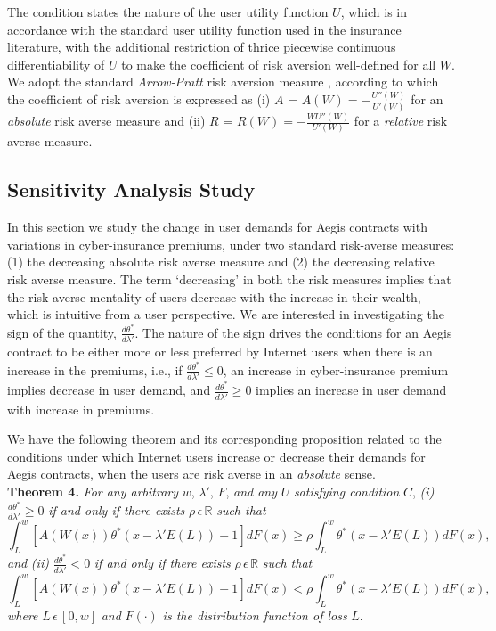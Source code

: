 \documentclass[letterpaper,12pt, onecolumn, nodraft]{IEEEtran}
\begin{document}
The condition states the nature of the user utility function $U$, which is in accordance with the standard user utility function used in the insurance literature, with the additional restriction of thrice piecewise continuous differentiability of $U$ to make the coefficient of risk aversion well-defined for all $W$. We adopt the standard \emph{Arrow-Pratt} risk aversion measure \cite{mwg}, according to which the coefficient of risk aversion is expressed as (i) $A$ = $A(W) = -\frac{U''(W)}{U'(W)}$ for an \emph{absolute} risk averse measure and (ii) $R$ = $R(W) = -\frac{WU''(W)}{U'(W)}$  for a \emph{relative} risk averse measure. 
\subsection{Sensitivity Analysis Study}
In this section we study the change in user demands for Aegis contracts with variations in cyber-insurance premiums, under two standard risk-averse measures: (1) the decreasing absolute risk averse measure and (2) the decreasing relative risk averse measure. The term `decreasing' in both the risk measures implies that the risk averse mentality of users decrease with the increase in their wealth, which is intuitive from a user perspective. We are interested in investigating the sign of the quantity, $\frac{d\theta^{*}}{d\lambda'}$. The nature of the sign drives the conditions for an Aegis contract to be either more or less preferred by Internet users when there is an increase in the premiums, i.e., if $\frac{d\theta^{*}}{d\lambda'} \le 0$, an increase in cyber-insurance premium implies decrease in user demand, and $\frac{d\theta^{*}}{d\lambda'}  \ge 0$ implies an increase in user demand with increase in premiums.   

We have the following theorem and its corresponding proposition related to the conditions under which Internet users increase or decrease their demands for Aegis contracts, when the users are risk averse in an \emph{absolute} sense. \\ 
\textbf{Theorem 4.} \emph{For any arbitrary} $w$, $\lambda'$, $F$, \emph{and any} $U$ \emph{satisfying condition} $C$, \emph{(i)} $\frac{d\theta^{*}}{d\lambda'} \ge 0$ \emph{if and only if there exists} $\rho\,\epsilon\,\mathbb{R}$ \emph{such that}
\begin{equation}
\int_{L}^{w}[A(W(x))\theta^{*}(x - \lambda' E(L)) - 1]dF(x) \ge \rho\int_{L}^{w}\theta^{*}(x - \lambda' E(L))dF(x),
\end{equation}
\emph{and} \emph{(ii)} $\frac{d\theta^{*}}{d\lambda'} < 0$ \emph{if and only if there exists} $\rho\,\epsilon\,\mathbb{R}$ \emph{such that}
\begin{equation}
\int_{L}^{w}[A(W(x))\theta^{*}(x - \lambda' E(L)) - 1]dF(x) < \rho\int_{L}^{w}\theta^{*}(x - \lambda' E(L))dF(x),
\end{equation}
\emph{where} $L\,\epsilon\,[0,w]$ \emph{and} $F(\cdot)$ \emph{is the distribution function of loss} $L$. 
\\
\end{document}
